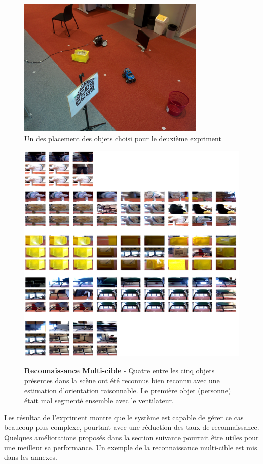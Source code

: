 \begin{figure}[H]
	\begin{center}\includegraphics[width=0.8\textwidth]{exp2.jpg}\end{center}
	\label{fig:exp2}
	\caption{Un des placement des objets choisi pour le deuxième expriment}
\end{figure}

\begin{figure}[H]
	\includegraphics[width=\textwidth]{multi_recon2.png}
	\label{fig:recon}
	\caption{\textbf{Reconnaissance Multi-cible} - Quatre entre les cinq objets présentes dans la scène ont été reconnus bien reconnu avec une estimation d'orientation raisonnable. Le première objet (personne) était mal segmenté ensemble avec le ventilateur. }
\end{figure}

Les résultat de l'expriment montre que le système est capable de gérer ce cas beaucoup plus complexe, pourtant avec une réduction des taux de reconnaissance. Quelques améliorations proposés dans la section suivante pourrait être utiles pour une meilleur sa performance. Un exemple de la reconnaissance multi-cible est mis dans les annexes.  
